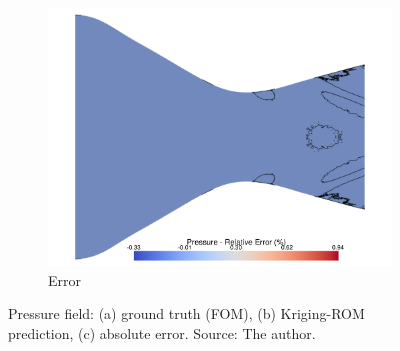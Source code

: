 \documentclass[tg, EN]{ufabcFHZh_tg}
\begin{document}
\begin{figure}[H]
\begin{subfigure}[b]{0.32\textwidth}
        \includegraphics[width=\textwidth]{Figuras/kriging_error_pressure.pdf}
        \caption{Error}
    \end{subfigure}
    \caption{Pressure field: (a) ground truth (FOM), (b) Kriging-ROM prediction, (c) absolute error. Source: The author.}
    \label{fig:kriging_reconstruction_pressure}
\end{figure}
\end{document}
